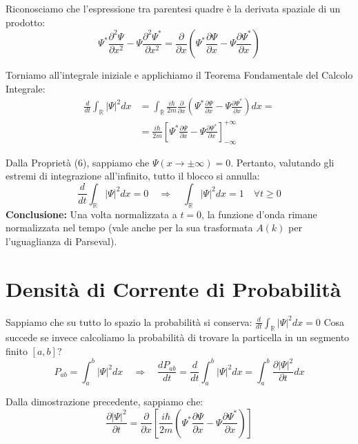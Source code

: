 \documentclass[11pt, a4paper]{article}
\begin{document}
\noindent
Riconosciamo che l'espressione tra parentesi quadre è la derivata spaziale di un prodotto: %
\begin{equation*}
    \Psi^* \frac{\partial^2 \Psi}{\partial x^2} - \Psi \frac{\partial^2 \Psi^*}{\partial x^2} = \frac{\partial}{\partial x} \left( \Psi^* \frac{\partial \Psi}{\partial x} - \Psi \frac{\partial \Psi^*}{\partial x} \right) %
\end{equation*}

Torniamo all'integrale iniziale e applichiamo il Teorema Fondamentale del Calcolo Integrale: %
\begin{align*}
    \frac{d}{dt} \int_{\mathbb{R}} |\Psi|^2 dx &= \int_{\mathbb{R}} \frac{i\hbar}{2m} \frac{\partial}{\partial x} \left( \Psi^* \frac{\partial \Psi}{\partial x} - \Psi \frac{\partial \Psi^*}{\partial x} \right) dx = \\ %
    &= \frac{i\hbar}{2m} \left[ \Psi^* \frac{\partial \Psi}{\partial x} - \Psi \frac{\partial \Psi^*}{\partial x} \right]_{-\infty}^{+\infty} %
\end{align*}

\noindent
Dalla Proprietà (6), sappiamo che $\Psi(x \to \pm\infty) = 0$. Pertanto, valutando gli estremi di integrazione all'infinito, tutto il blocco si annulla: %
\begin{equation}
    \frac{d}{dt} \int_{\mathbb{R}} |\Psi|^2 dx = 0 \quad \Rightarrow \quad \boxed{ \int_{\mathbb{R}} |\Psi|^2 dx = 1 \quad \forall t \ge 0 } %
\end{equation}
\textbf{Conclusione:} Una volta normalizzata a $t=0$, la funzione d'onda rimane normalizzata nel tempo (vale anche per la sua trasformata $A(k)$ per l'uguaglianza di Parseval). %

\section{Densità di Corrente di Probabilità} %

Sappiamo che su tutto lo spazio la probabilità si conserva: $\frac{d}{dt} \int_{\mathbb{R}} |\Psi|^2 dx = 0$ %
Cosa succede se invece calcoliamo la probabilità di trovare la particella in un segmento finito $[a, b]$? %
\begin{equation*}
    P_{ab} = \int_a^b |\Psi|^2 dx \quad \Rightarrow \quad \frac{dP_{ab}}{dt} = \frac{d}{dt} \int_a^b |\Psi|^2 dx = \int_a^b \frac{\partial |\Psi|^2}{\partial t} dx %
\end{equation*}

Dalla dimostrazione precedente, sappiamo che: %
\begin{equation*}
    \frac{\partial |\Psi|^2}{\partial t} = \frac{\partial}{\partial x} \left[ \frac{i\hbar}{2m} \left( \Psi^* \frac{\partial \Psi}{\partial x} - \Psi \frac{\partial \Psi^*}{\partial x} \right) \right] %
\end{equation*}
\end{document}
